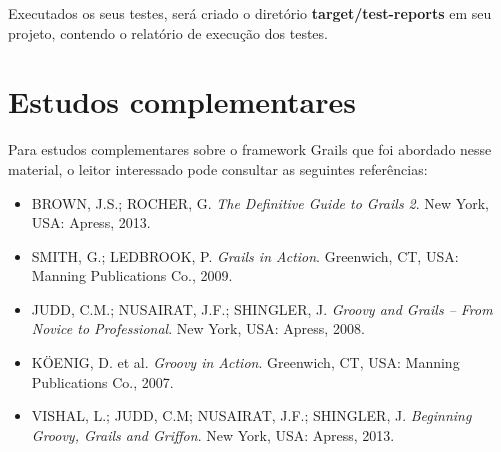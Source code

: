 Executados os seus testes, será  criado o diretório {\bf target/test-reports} em
seu projeto, contendo o relatório de execução dos testes.

\section{Estudos complementares}

\vspace{0.5cm}

Para  estudos complementares  sobre o  framework Grails  que foi  abordado nesse
material, o leitor interessado pode consultar as seguintes referências:

\begin{itemize}

\vspace{0.5cm}

\item  {BROWN, J.S.; ROCHER,  G. \emph{The  Definitive Guide  to Grails  2}. New
  York, USA: Apress, 2013.} 

\vspace{0.5cm}

\item  {SMITH, G.;  LEDBROOK, P.  \emph{Grails in  Action}. Greenwich,  CT, USA:
  Manning Publications Co., 2009.} 

\vspace{0.5cm}

\item {JUDD, C.M.; NUSAIRAT, J.F.;  SHINGLER, J. \emph{Groovy and Grails -- From
    Novice to Professional}. New York, USA: Apress, 2008.}  

\vspace{0.5cm}

\item  {K{\"O}ENIG, D.  et  al.  \emph{Groovy in  Action}.  Greenwich, CT,  USA:
  Manning Publications Co., 2007.}

\vspace{0.5cm}

\item  {VISHAL, L.;  JUDD,  C.M; NUSAIRAT,  J.F.;  SHINGLER, J.  \emph{Beginning
    Groovy, Grails and Griffon}. New York, USA: Apress, 2013.}

\end{itemize}
